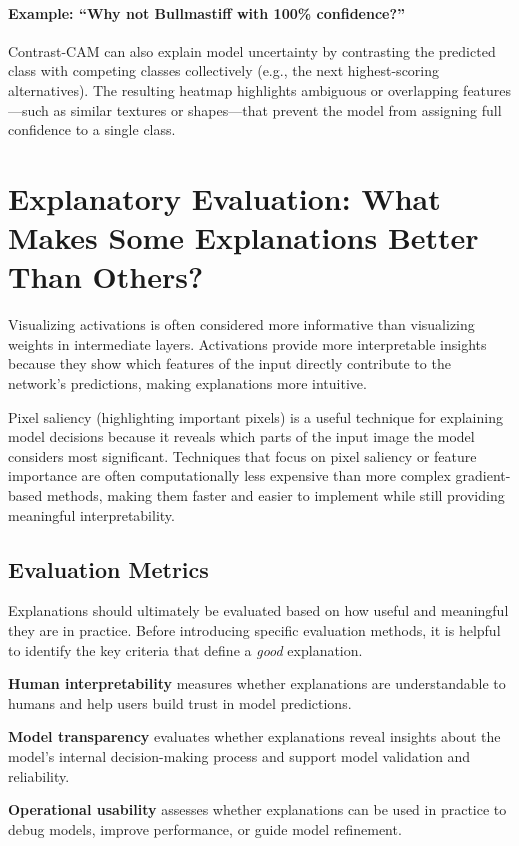 \documentclass{article}
\begin{document}
\paragraph{Example: ``Why not Bullmastiff with 100\% confidence?''}
Contrast-CAM can also explain model uncertainty by contrasting the predicted class with competing classes collectively (e.g., the next highest-scoring alternatives).
The resulting heatmap highlights ambiguous or overlapping features—such as similar textures or shapes—that prevent the model from assigning full confidence to a single class.

\section{Explanatory Evaluation: What Makes Some Explanations Better Than Others?}

Visualizing activations is often considered more informative than visualizing weights in intermediate layers. Activations provide more interpretable insights because they show which features of the input directly contribute to the network’s predictions, making explanations more intuitive.

Pixel saliency (highlighting important pixels) is a useful technique for explaining model decisions because it reveals which parts of the input image the model considers most significant. Techniques that focus on pixel saliency or feature importance are often computationally less expensive than more complex gradient-based methods, making them faster and easier to implement while still providing meaningful interpretability.

\subsection{Evaluation Metrics}

Explanations should ultimately be evaluated based on how useful and meaningful they are in practice. Before introducing specific evaluation methods, it is helpful to identify the key criteria that define a \emph{good} explanation.

\textbf{Human interpretability} measures whether explanations are understandable to humans and help users build trust in model predictions.

\textbf{Model transparency} evaluates whether explanations reveal insights about the model’s internal decision-making process and support model validation and reliability.

\textbf{Operational usability} assesses whether explanations can be used in practice to debug models, improve performance, or guide model refinement.
\end{document}
